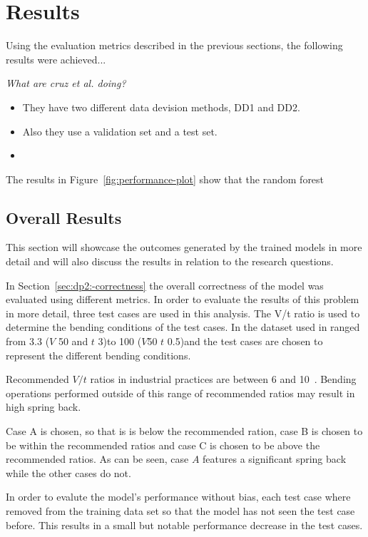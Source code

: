 \section{Results}\label{sec:overall-results}
Using the evaluation metrics described in the previous sections, the
following results were
achieved...

\textit{What are cruz et al. doing?}
\begin{itemize}
\item They have two different data devision methods, DD1 and DD2.
\item Also they use a validation set and a test set.
\item
\end{itemize}

The results in Figure~\ref{fig:performance-plot} show that the random forest

\subsection{Overall Results}\label{subsec:overall-results}
This section will showcase the outcomes generated by the trained models in more detail and
will also discuss the results in relation to the research questions.

In Section~\ref{sec:dp2:-correctness} the overall correctness of the model was
evaluated using different metrics.
In order to evaluate the results of this problem in more detail, three test cases are used
in this analysis.
The V/t ratio is used to determine the bending conditions of the test cases. In the
dataset used in ranged from 3.3 ($V$ 50 and $t$ 3)to 100 ($V$50 $t$ 0.5)and the test
cases are chosen to represent the different bending conditions.

Recommended $V/t$ ratios in industrial practices are between 6 and 10~\cite[p.7]{
cruz_applicationmachinelearning_2021}.
Bending operations performed outside of this range of recommended ratios may result in
high spring back.

Case A is chosen, so that is is below the recommended ration, case B is chosen to be
within the recommended ratios and case C is chosen to be above the recommended ratios.
As can be seen, case $A $ features a significant spring back while the other cases do not.

In order to evalute the model's performance without bias, each test case where removed
from
the training data set so that the model has not seen the test case before.
This results in a small but notable performance decrease in the test cases.
%

